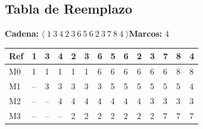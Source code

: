 \documentclass[12pt,a4paper]{article}
\begin{document}
\subsection{Tabla de Reemplazo}
\textbf{Cadena:} $\langle\;1\ 3\ 4\ 2\ 3\ 6\ 5\ 6\ 2\ 3\ 7\ 8\ 4\;\rangle$\quad\textbf{Marcos:} 4
\medskip
\begin{center}
\scriptsize\setlength{\tabcolsep}{2pt}
\begin{tabular}{|l|>{\centering\arraybackslash}p{0.4cm}|>{\centering\arraybackslash}p{0.4cm}|>{\centering\arraybackslash}p{0.4cm}|>{\centering\arraybackslash}p{0.4cm}|>{\centering\arraybackslash}p{0.4cm}|>{\centering\arraybackslash}p{0.4cm}|>{\centering\arraybackslash}p{0.4cm}|>{\centering\arraybackslash}p{0.4cm}|>{\centering\arraybackslash}p{0.4cm}|>{\centering\arraybackslash}p{0.4cm}|>{\centering\arraybackslash}p{0.4cm}|>{\centering\arraybackslash}p{0.4cm}|>{\centering\arraybackslash}p{0.4cm}|}
\hline
\textbf{Ref} & \cellcolor{faultcol!50}\textbf{1} & \cellcolor{faultcol!50}\textbf{3} & \cellcolor{faultcol!50}\textbf{4} & \cellcolor{faultcol!50}\textbf{2} & \cellcolor{hitcol!40}\textbf{3} & \cellcolor{faultcol!50}\textbf{6} & \cellcolor{faultcol!50}\textbf{5} & \cellcolor{hitcol!40}\textbf{6} & \cellcolor{hitcol!40}\textbf{2} & \cellcolor{faultcol!50}\textbf{3} & \cellcolor{faultcol!50}\textbf{7} & \cellcolor{faultcol!50}\textbf{8} & \cellcolor{faultcol!50}\textbf{4} \\
\hline
M0 & \cellcolor{pB!40}1 & \cellcolor{pB!40}1 & \cellcolor{pB!40}1 & \cellcolor{pB!40}1 & \cellcolor{pB!40}1 & \cellcolor{pG!40}6 & \cellcolor{pG!40}6 & \cellcolor{pG!40}6 & \cellcolor{pG!40}6 & \cellcolor{pG!40}6 & \cellcolor{pG!40}6 & \cellcolor{pI!40}8 & \cellcolor{pI!40}8 \\
M1 & {\color{gray!60}--} & \cellcolor{pD!40}3 & \cellcolor{pD!40}3 & \cellcolor{pD!40}3 & \cellcolor{pD!40}3 & \cellcolor{pD!40}3 & \cellcolor{pF!40}5 & \cellcolor{pF!40}5 & \cellcolor{pF!40}5 & \cellcolor{pF!40}5 & \cellcolor{pF!40}5 & \cellcolor{pF!40}5 & \cellcolor{pE!40}4 \\
M2 & {\color{gray!60}--} & {\color{gray!60}--} & \cellcolor{pE!40}4 & \cellcolor{pE!40}4 & \cellcolor{pE!40}4 & \cellcolor{pE!40}4 & \cellcolor{pE!40}4 & \cellcolor{pE!40}4 & \cellcolor{pE!40}4 & \cellcolor{pD!40}3 & \cellcolor{pD!40}3 & \cellcolor{pD!40}3 & \cellcolor{pD!40}3 \\
M3 & {\color{gray!60}--} & {\color{gray!60}--} & {\color{gray!60}--} & \cellcolor{pC!40}2 & \cellcolor{pC!40}2 & \cellcolor{pC!40}2 & \cellcolor{pC!40}2 & \cellcolor{pC!40}2 & \cellcolor{pC!40}2 & \cellcolor{pC!40}2 & \cellcolor{pH!40}7 & \cellcolor{pH!40}7 & \cellcolor{pH!40}7 \\

\end{tabular}
\end{center}
\end{document}
